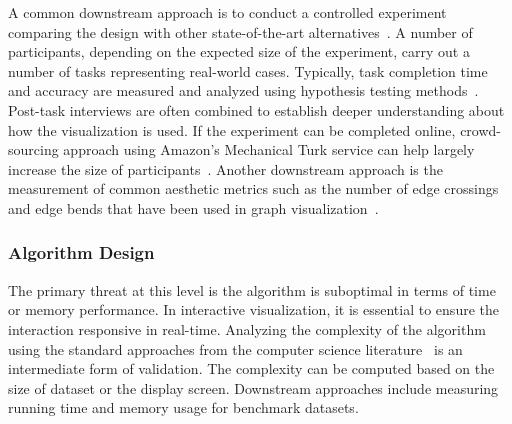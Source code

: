 A common downstream approach is to conduct a controlled experiment comparing the design with other state-of-the-art alternatives~\cite{Xu2012}. A number of participants, depending on the  expected size of the experiment, carry out a number of tasks representing real-world cases. Typically, task completion time and accuracy are measured and analyzed using hypothesis testing methods~\cite{Field2003}. Post-task interviews are often combined to establish deeper understanding about how the visualization is used. If the experiment can be completed online, crowd-sourcing approach using Amazon's Mechanical Turk service can help largely increase the size of participants~\cite{Heer2010a}. Another downstream approach is the measurement of common aesthetic metrics such as the number of edge crossings and edge bends that have been used in graph visualization~\cite{Sugiyama1981}.

\subsubsection{Algorithm Design}
The primary threat at this level is the algorithm is suboptimal in terms of time or memory performance. In interactive visualization, it is essential to ensure the interaction responsive in real-time. Analyzing the complexity of the algorithm using the standard approaches from the computer science literature~\cite{Cormen2009} is an intermediate form of validation. The complexity can be computed based on the size of dataset or the display screen. Downstream approaches include measuring running time and memory usage for benchmark datasets.

